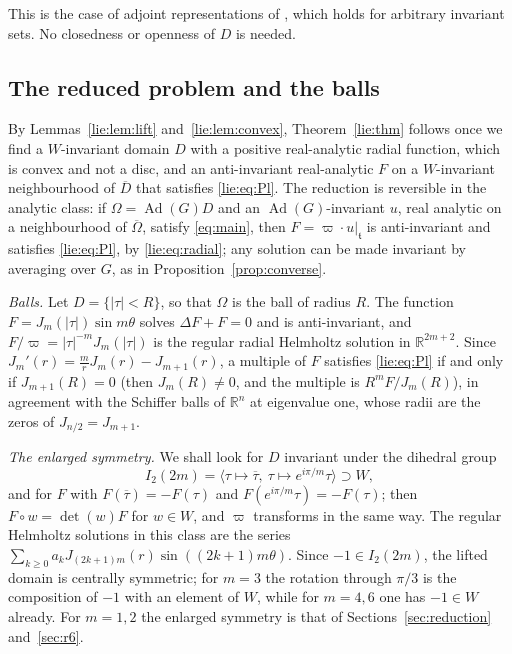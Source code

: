 \documentclass[11pt]{amsart}
\theoremstyle{definition}
\theoremstyle{remark}
\numberwithin{equation}{section}
\newcommand{\R}{\mathbb{R}}
\newcommand{\Ad}{\operatorname{Ad}}
\newcommand{\tf}{\mathfrak{t}}
\begin{document}
This is the case of adjoint representations of \cite[Theorem~3.6]{Lew00}, which holds for arbitrary invariant sets. No closedness or openness of $D$ is needed.

\subsection{The reduced problem and the balls}\label{lie:subsec:reduced}

By Lemmas~\ref{lie:lem:lift} and~\ref{lie:lem:convex}, Theorem~\ref{lie:thm} follows once we find a $W$-invariant domain $D$ with a positive real-analytic radial function, which is convex and not a disc, and an anti-invariant real-analytic $F$ on a $W$-invariant neighbourhood of $\overline D$ that satisfies \eqref{lie:eq:Pl}. The reduction is reversible in the analytic class: if $\Omega=\Ad(G)D$ and an $\Ad(G)$-invariant $u$, real analytic on a neighbourhood of $\overline\Omega$, satisfy \eqref{eq:main}, then $F=\varpi\cdot u|_\tf$ is anti-invariant and satisfies \eqref{lie:eq:Pl}, by \eqref{lie:eq:radial}; any solution can be made invariant by averaging over $G$, as in Proposition~\ref{prop:converse}.

\emph{Balls.} Let $D=\{|\tau|<R\}$, so that $\Omega$ is the ball of radius $R$. The function $F=J_m(|\tau|)\sin m\theta$ solves $\Delta F+F=0$ and is anti-invariant, and $F/\varpi=|\tau|^{-m}J_m(|\tau|)$ is the regular radial Helmholtz solution in $\R^{2m+2}$. Since $J_m'(r)=\frac mrJ_m(r)-J_{m+1}(r)$, a multiple of $F$ satisfies \eqref{lie:eq:Pl} if and only if $J_{m+1}(R)=0$ (then $J_m(R)\neq0$, and the multiple is $R^mF/J_m(R)$), in agreement with the Schiffer balls of $\R^n$ at eigenvalue one, whose radii are the zeros of $J_{n/2}=J_{m+1}$.

\emph{The enlarged symmetry.} We shall look for $D$ invariant under the dihedral group
\[
I_2(2m)=\langle\tau\mapsto\overline\tau,\ \tau\mapsto e^{i\pi/m}\tau\rangle\supset W,
\]
and for $F$ with $F(\overline\tau)=-F(\tau)$ and $F(e^{i\pi/m}\tau)=-F(\tau)$; then $F\circ w=\det(w)F$ for $w\in W$, and $\varpi$ transforms in the same way. The regular Helmholtz solutions in this class are the series $\sum_{k\geq0}a_kJ_{(2k+1)m}(r)\sin((2k+1)m\theta)$. Since $-1\in I_2(2m)$, the lifted domain is centrally symmetric; for $m=3$ the rotation through $\pi/3$ is the composition of $-1$ with an element of $W$, while for $m=4,6$ one has $-1\in W$ already. For $m=1,2$ the enlarged symmetry is that of Sections~\ref{sec:reduction} and~\ref{sec:r6}.
\end{document}
